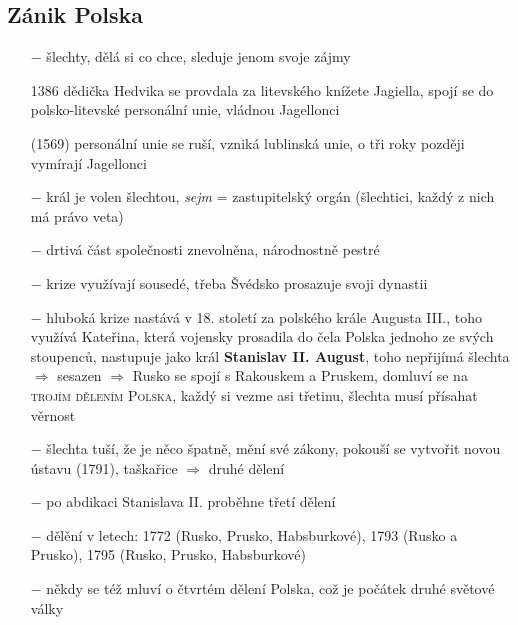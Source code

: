 \documentclass{article}
\begin{document}
\subsection*{Zánik Polska}
\begin{itemize}
    \vspace{-0.5em}
    \setlength\itemsep{0.15em}
    \item[$-$]  šlechty, dělá si co chce, sleduje jenom svoje zájmy
    \item[1386] dědička Hedvika se provdala za litevského knížete Jagiella, spojí se do polsko-litevské personální unie, vládnou Jagellonci
    \item[(1569)] personální unie se ruší, vzniká lublinská unie, o tři roky později vymírají Jagellonci
    \item[$-$] král je volen šlechtou, \textit{sejm} = zastupitelský orgán (šlechtici, každý z nich má právo veta)
    \item[$-$] drtivá část společnosti znevolněna, národnostně pestré
    \item[$-$] krize využívají sousedé, třeba Švédsko prosazuje svoji dynastii
    \item[$-$] hluboká krize nastává v 18. století za polského krále Augusta III., toho využívá Kateřina, která vojensky prosadila do čela Polska jednoho ze svých stoupenců, nastupuje jako král \textbf{Stanislav II. August}, toho nepřijímá šlechta $\Rightarrow$ sesazen $\Rightarrow$ Rusko se spojí s Rakouskem a Pruskem, domluví se na \textsc{trojím dělením Polska}, každý si vezme asi třetinu, šlechta musí přísahat věrnost
    \item[$-$] šlechta tuší, že je něco špatně, mění své zákony, pokouší se vytvořit novou ústavu (1791), taškařice $\Rightarrow$ druhé dělení
    \item[$-$] po abdikaci Stanislava II. proběhne třetí dělení
    \item[$-$] dělění v letech: 1772 (Rusko, Prusko, Habsburkové), 1793 (Rusko a Prusko), 1795 (Rusko, Prusko, Habsburkové)
    \item[$-$] někdy se též mluví o čtvrtém dělení Polska, což je počátek druhé světové války
\end{itemize}
\end{document}
